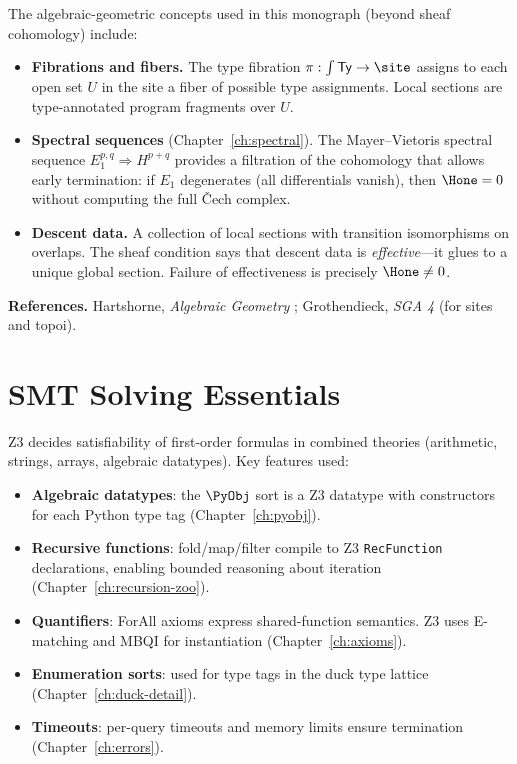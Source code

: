 The algebraic-geometric concepts used in this monograph (beyond
sheaf cohomology) include:

\begin{itemize}
  \item \textbf{Fibrations and fibers.}
    The type fibration $\pi : \int \mathsf{Ty} \to \site$ assigns
    to each open set $U$ in the site a fiber of possible type
    assignments.  Local sections are type-annotated program fragments
    over $U$.

  \item \textbf{Spectral sequences} (Chapter~\ref{ch:spectral}).
    The Mayer--Vietoris spectral sequence
    $E_1^{p,q} \Rightarrow H^{p+q}$ provides a filtration of the
    cohomology that allows early termination: if $E_1$ degenerates
    (all differentials vanish), then $\Hone = 0$ without computing
    the full \v{C}ech complex.

  \item \textbf{Descent data.}
    A collection of local sections with transition isomorphisms
    on overlaps.  The sheaf condition says that descent data is
    \emph{effective}---it glues to a unique global section.
    Failure of effectiveness is precisely $\Hone \neq 0$.
\end{itemize}

\noindent
\textbf{References.}
Hartshorne, \emph{Algebraic Geometry} \cite{hartshorne1977};
Grothendieck, \emph{SGA 4} (for sites and topoi).

\section{SMT Solving Essentials}

Z3 decides satisfiability of first-order formulas in combined theories
(arithmetic, strings, arrays, algebraic datatypes).  Key features
used:
\begin{itemize}
  \item \textbf{Algebraic datatypes}: the $\PyObj$ sort is a Z3
    datatype with constructors for each Python type tag
    (Chapter~\ref{ch:pyobj}).
  \item \textbf{Recursive functions}: fold/map/filter compile to Z3
    \texttt{RecFunction} declarations, enabling bounded reasoning
    about iteration (Chapter~\ref{ch:recursion-zoo}).
  \item \textbf{Quantifiers}: ForAll axioms express shared-function
    semantics.  Z3 uses E-matching and MBQI for instantiation
    (Chapter~\ref{ch:axioms}).
  \item \textbf{Enumeration sorts}: used for type tags in the duck
    type lattice (Chapter~\ref{ch:duck-detail}).
  \item \textbf{Timeouts}: per-query timeouts and memory limits
    ensure termination (Chapter~\ref{ch:errors}).
\end{itemize}

